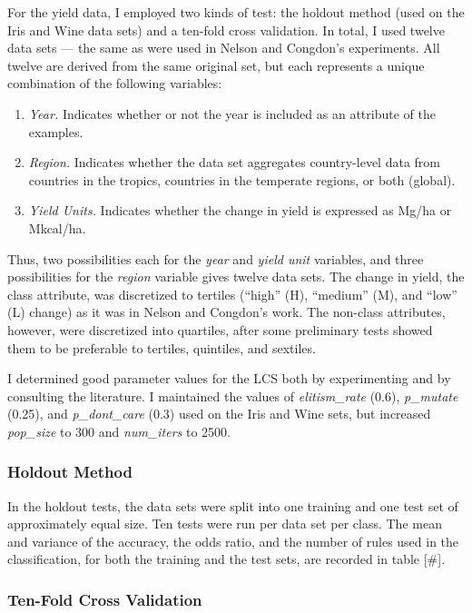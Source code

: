 \documentclass[11pt]{article}
\begin{document}
For the yield data, I employed two kinds of test: the holdout method (used on the Iris and Wine data sets) and a ten-fold cross validation. In total, I used twelve data sets --- the same as were used in Nelson and Congdon's experiments. All twelve are derived from the same original set, but each represents a unique combination of the following variables:
\begin{enumerate}
\item \textit{Year.} Indicates whether or not the year is included as an attribute of the examples.
\item \textit{Region.} Indicates whether the data set aggregates country-level data from countries in the tropics, countries in the temperate regions, or both (global).
\item \textit{Yield Units.} Indicates whether the change in yield is expressed as Mg/ha or Mkcal/ha.
\end{enumerate}
Thus, two possibilities  each for the \textit{year} and \textit{yield unit} variables, and three possibilities for the \textit{region} variable gives twelve data sets. The change in yield, the class attribute, was discretized to tertiles (``high'' (H), ``medium'' (M), and ``low'' (L) change) as it was in Nelson and Congdon's work. The non-class attributes, however, were discretized into quartiles, after some preliminary tests showed them to be preferable to tertiles, quintiles, and sextiles.

I determined good parameter values for the LCS both by experimenting and by consulting the literature. I maintained the values of \textit{elitism\_rate} (0.6), \textit{p\_mutate} (0.25), and \textit{p\_dont\_care} (0.3) used on the Iris and Wine sets, but increased \textit{pop\_size} to 300 and \textit{num\_iters} to 2500.

\subsubsection{Holdout Method}

In the holdout tests, the data sets were split into one training and one test set of approximately equal size. Ten tests were run per data set per class. The mean and variance of the accuracy, the odds ratio, and the number of rules used in the classification, for both the training and the test sets, are recorded in table [\#].

\subsubsection{Ten-Fold Cross Validation}
\end{document}
